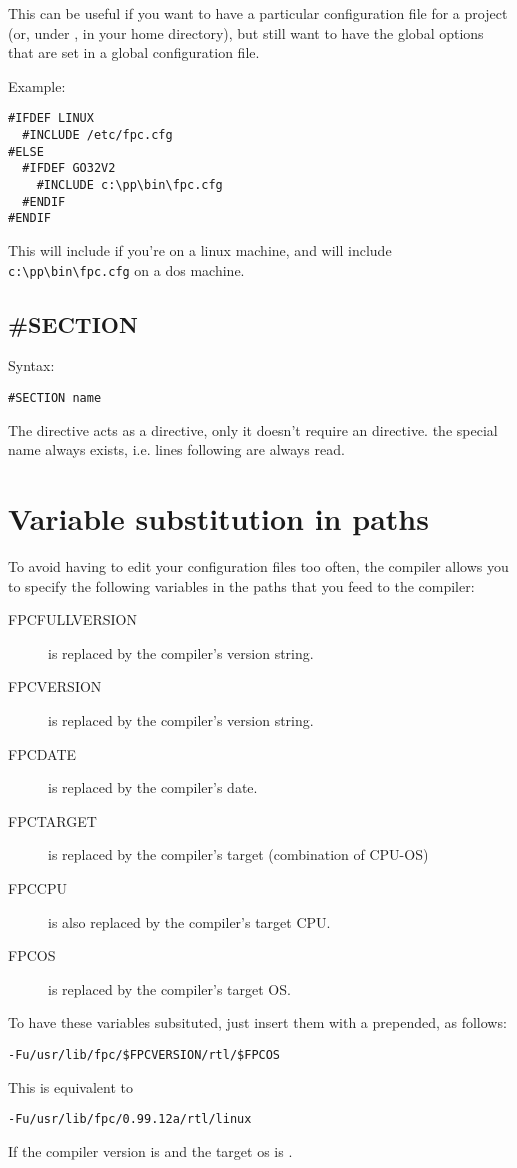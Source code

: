 This can be useful if you want to have a particular configuration file
for a project (or, under \linux, in your home directory), but still want to
have the global options that are set in a global configuration file.

Example:
\begin{verbatim}
#IFDEF LINUX
  #INCLUDE /etc/fpc.cfg
#ELSE
  #IFDEF GO32V2
    #INCLUDE c:\pp\bin\fpc.cfg
  #ENDIF
#ENDIF
\end{verbatim}
This will include  if you're on a linux machine,
and will include \verb+c:\pp\bin\fpc.cfg+
on a dos machine.

\subsection{\#SECTION}
Syntax:
\begin{verbatim}
#SECTION name
\end{verbatim}
The  directive acts as a  directive, only
it doesn't require an  directive. the special name 
always exists, i.e. lines following  are always read.

\section{Variable substitution in paths}
To avoid having to edit your configuration files too often,
the compiler allows you to specify the following variables in
the paths that you feed to the compiler:
\begin{description}
\item[FPCFULLVERSION] is replaced by the compiler's version string.
\item[FPCVERSION] is replaced by the compiler's version string.
\item[FPCDATE] is replaced by the compiler's date.
\item[FPCTARGET] is replaced by the compiler's target (combination of CPU-OS)
\item[FPCCPU] is also replaced by the compiler's target CPU.
\item[FPCOS] is replaced by the compiler's target OS.
\end{description}
To have these variables subsituted, just insert them with a \var{\$}
prepended, as follows:
\begin{verbatim}
-Fu/usr/lib/fpc/$FPCVERSION/rtl/$FPCOS
\end{verbatim}
This is equivalent to
\begin{verbatim}
-Fu/usr/lib/fpc/0.99.12a/rtl/linux
\end{verbatim}
If the compiler version is  and the target os is .

